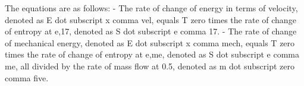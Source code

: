 The equations are as follows:
- The rate of change of energy in terms of velocity, denoted as E dot subscript x comma vel, equals T zero times the rate of change of entropy at e,17, denoted as S dot subscript e comma 17.
- The rate of change of mechanical energy, denoted as E dot subscript x comma mech, equals T zero times the rate of change of entropy at e,me, denoted as S dot subscript e comma me, all divided by the rate of mass flow at 0.5, denoted as m dot subscript zero comma five.